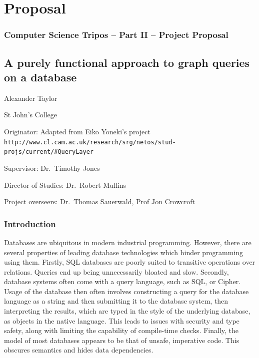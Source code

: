 \documentclass[12pt,a4paper,twoside,openright]{report}
\begin{document}
\chapter{Proposal}

\hypertarget{computer-science-tripos-part-ii-project-proposal}{%
\subsection{Computer Science Tripos -- Part II -- Project
Proposal}\label{computer-science-tripos-part-ii-project-proposal}}

\hypertarget{a-purely-functional-approach-to-graph-queries-on-a-database}{%
\section{A purely functional approach to graph queries on a
database}\label{a-purely-functional-approach-to-graph-queries-on-a-database}}

Alexander Taylor

St John's College

Originator: Adapted from Eiko Yoneki's project
\texttt{http://www.cl.cam.ac.uk/research/srg/netos/stud-projs/current/\#QueryLayer}

Supervisor: Dr.~Timothy Jones

Director of Studies: Dr.~Robert Mullins

Project overseers: Dr.~Thomas Sauerwald, Prof Jon Crowcroft

\hypertarget{introduction}{%
\subsection{Introduction}\label{introduction}}

Databases are ubiquitous in modern industrial programming. However,
there are several properties of leading database technologies which
hinder programming using them. Firstly, SQL databases are poorly suited
to transitive operations over relations. Queries end up being
unnecessarily bloated and slow. Secondly, database systems often come
with a query language, such as SQL, or Cipher. Usage of the database
then often involves constructing a query for the database language as a
string and then submitting it to the database system, then interpreting
the results, which are typed in the style of the underlying database, as
objects in the native language. This leads to issues with security and
type safety, along with limiting the capability of compile-time checks.
Finally, the model of most databases appears to be that of unsafe,
imperative code. This obscures semantics and hides data dependencies.
\end{document}
